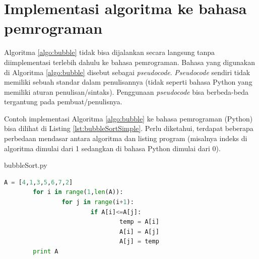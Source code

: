 \section{Implementasi algoritma ke bahasa pemrograman}
Algoritma \ref{algo:bubble} tidak bisa dijalankan secara langsung tanpa diimplementasi terlebih dahulu ke bahasa pemrograman. Bahasa yang digunakan di Algoritma \ref{algo:bubble} disebut sebagai \textit{pseudocode}. \textit{Pseudocode} sendiri tidak memiliki sebuah standar dalam penulisannya (tidak seperti bahasa Python yang memiliki aturan penulisan/sintaks). Penggunaan \textit{pseudocode} bisa berbeda-beda tergantung pada pembuat/penulisnya. 

Contoh implementasi Algoritma \ref{algo:bubble} ke bahasa pemrograman (Python) bisa dilihat di Listing \ref{lst:bubbleSortSimple}. Perlu diketahui, terdapat beberapa perbedaan mendasar antara algoritma dan listing program (misalnya indeks di algoritma dimulai dari 1 sedangkan di bahasa Python dimulai dari 0). 

\begin{listprog}{bubbleSort.py}
	\label{lst:bubbleSortSimple}
	\begin{lstlisting}[language=Python]
		A = [4,1,3,5,6,7,2]
		for i in range(1,len(A)):
				for j in range(i+1):
						if A[i]<=A[j]:
								temp = A[i]
								A[i] = A[j]
								A[j] = temp
		print A
	\end{lstlisting}
\end{listprog}

		


